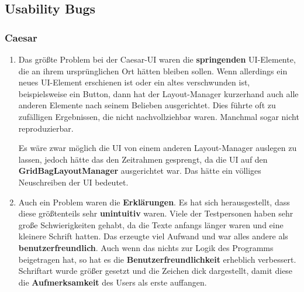 \documentclass{article}
\begin{document}
  \subsection{Usability Bugs}
    \subsubsection{Caesar}
     \begin{enumerate}
      \item Das größte Problem bei der Caesar-UI waren die \textbf{springenden} UI-Elemente, die an ihrem ursprünglichen Ort hätten bleiben sollen.
            Wenn allerdings ein neues UI-Element erschienen ist oder ein altes verschwunden ist, beispielsweise ein Button, dann hat der Layout-Manager kurzerhand auch alle anderen
            Elemente nach seinem Belieben ausgerichtet. Dies führte oft zu zufälligen Ergebnissen, die nicht nachvollziehbar waren. Manchmal sogar nicht reproduzierbar.
      
            Es wäre zwar möglich die UI von einem anderen Layout-Manager auslegen zu lassen, jedoch hätte das den Zeitrahmen gesprengt, da die UI
            auf den \textbf{GridBagLayoutManager} ausgerichtet war. Das hätte ein völliges Neuschreiben der UI bedeutet. 
            
      \item Auch ein Problem waren die \textbf{Erklärungen}. Es hat sich herausgestellt, dass diese größtenteils sehr \textbf{unintuitiv} waren.
            Viele der Testpersonen haben sehr große Schwierigkeiten gehabt, da die Texte anfangs länger waren und eine kleinere Schrift hatten.
            Das erzeugte viel Aufwand und war alles andere als \textbf{benutzerfreundlich}.\newline
            Auch wenn das nichts zur Logik des Programms beigetragen hat, so hat es die \textbf{Benutzerfreundlichkeit} erheblich verbessert. 
            Schriftart wurde größer gesetzt und die Zeichen dick dargestellt, damit diese die \textbf{Aufmerksamkeit} des Users als erste auffangen.
            

\end{enumerate}
\end{document}
